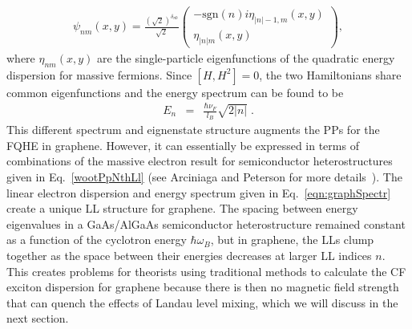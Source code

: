     \begin{eqnarray}
        \psi_{nm}(x,y) = \frac{(\sqrt{2})^{\delta_{n0}}}{\sqrt{2}}
        \begin{pmatrix}
        -\mathrm{sgn}(n) i \eta_{|n|-1,m}(x,y) \\
        \eta_{|n|m}(x,y)
        \end{pmatrix},
    \end{eqnarray}
    where $\eta_{nm}(x,y)$ are the single-particle eigenfunctions of the quadratic energy dispersion for massive fermions. Since $[H,H^2]=0$, the two Hamiltonians share common eigenfunctions and the energy spectrum can be found to be
    \begin{eqnarray} \label{eqn:graphSpectr}
        E_n &=& \frac{\hbar \nu_F}{l_B} \sqrt{2|n|}\;.
    \end{eqnarray}
    This different spectrum and eignenstate structure augments the PPs for the FQHE in graphene. However, it can essentially be expressed in terms of combinations of the massive electron result for semiconductor heterostructures given in Eq.~\ref{wootPpNthLl} (see Arciniaga and Peterson for more details~\cite{arciniaga}). The linear electron dispersion and energy spectrum given in Eq.~\ref{eqn:graphSpectr} create a unique LL structure for graphene. The spacing between energy eigenvalues in a GaAs/AlGaAs semiconductor heterostructure remained constant as a function of the cyclotron energy $\hbar\omega_B$, but in graphene, the LLs clump together as the space between their energies decreases at larger LL indices $n$. This creates problems for theorists using traditional methods to calculate the CF exciton dispersion for graphene because there is then no magnetic field strength that can quench the effects of Landau level mixing, which we will discuss in the next section.
	
